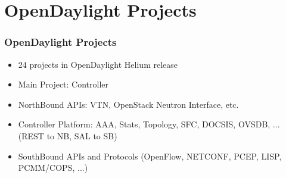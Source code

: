 \section{OpenDaylight Projects}

\begin{frame}
\frametitle{OpenDaylight Projects}

\begin{itemize}
 \item 24 projects in OpenDaylight Helium release
 \item Main Project: Controller
 \item NorthBound APIs: VTN, OpenStack Neutron Interface, etc.
 \item Controller Platform: AAA, Stats, Topology, SFC, DOCSIS, OVSDB, ... (REST to NB, SAL to SB)
 \item SouthBound APIs and Protocols (OpenFlow, NETCONF, PCEP, LISP, PCMM/COPS, ...)
\end{itemize}

\end{frame}

